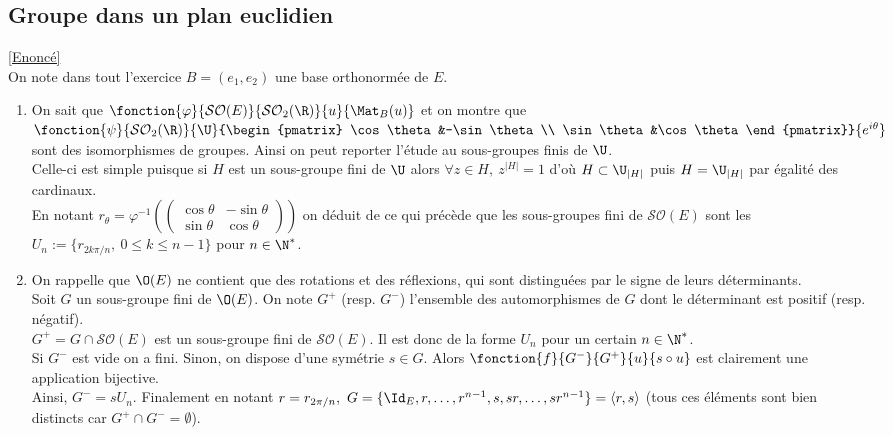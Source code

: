 \documentclass[8pt]{book}
\begin{document}
	\subsection{Groupe dans un plan euclidien }
	\label{Groupe dans un plan euclidien corrigé}
	\textcolor{blue}{\hyperref[Groupe dans un plan euclidien]{[Enoncé]}}\\
	On note dans tout l'exercice $B=(e_1,e_2)$ une base orthonormée de $E$.
	\begin{enumerate}
		\item On sait que $\fonction{\varphi}{\mathcal{SO}(E)}{\mathcal{SO}_2(\R)}{u}{\Mat_B(u)}$ et on montre que $\fonction{\psi}{\mathcal{SO}_2(\R)}{\U}{\begin{pmatrix}
				\cos\theta&-\sin\theta\\
				\sin\theta&\cos\theta
		\end{pmatrix}}{e^{i\theta}}$ sont des isomorphismes de groupes. Ainsi on peut reporter l'étude au sous-groupes finis de $\U$.\\
		Celle-ci est simple puisque si $H$ est un sous-groupe fini de $\U$ alors $\forall z\in H,\ z^{|H|}=1$ d'où $H\subset\U_{|H|}$ puis $H=\U_{|H|}$ par égalité des cardinaux.\\
		En notant $r_\theta=\varphi^{-1}\left(\begin{pmatrix}
			\cos\theta&-\sin\theta\\
			\sin\theta&\cos\theta
		\end{pmatrix}\right)$ on déduit de ce qui précède que les sous-groupes fini de $\mathcal{SO}(E)$ sont les $U_n:=\{r_{2k\pi/n},\ 0\leq k\leq n-1\}$ pour $n\in \N^*$.
		\item On rappelle que $\O(E)$ ne contient que des rotations et des réflexions, qui sont distinguées par le signe de leurs déterminants.\\
		Soit $G$ un sous-groupe fini de $\O(E)$. On note $G^+$ (resp. $G^-$) l'ensemble des automorphismes de $G$ dont le déterminant est positif (resp. négatif).\\
		$G^+=G\cap\mathcal{SO}(E)$ est un sous-groupe fini de $\mathcal{SO}(E)$. Il est donc de la forme $U_n$ pour un certain $n\in \N^*$.\\
		Si $G^-$ est vide on a fini. Sinon, on dispose d'une symétrie $s\in G$. Alors $\fonction{f}{G^-}{G^+}{u}{s\circ u}$ est clairement une application bijective.\\
		Ainsi, $G^-=sU_n$. Finalement en notant $r=r_{2\pi/n},\ G=\{\Id_E,r,\dots,r^{n-1},s,sr,\dots,sr^{n-1}\}=\langle r,s\rangle$ (tous ces éléments sont bien distincts car $G^+\cap G^-=\emptyset$).\\

\end{enumerate}
\end{document}

